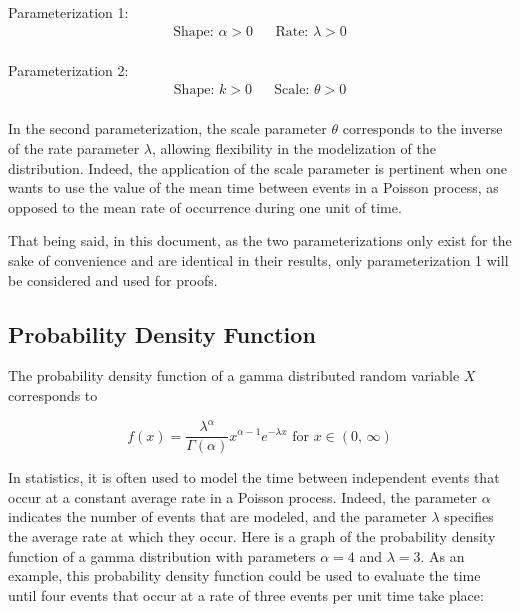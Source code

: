 \documentclass[12pt]{article}
\begin{document}
\noindent Parameterization 1:\vspace*{-24pt}
\begin{align*}
	\text{Shape: } \alpha>0		&&	\text{Rate: }\lambda>0
\end{align*}\\[-60pt]

\noindent Parameterization 2:\vspace*{-24pt}
\begin{align*}
	\text{Shape: } k>0			&&	\text{Scale: }\theta>0
\end{align*}\\[-60pt]

In the second parameterization, the scale parameter $\theta$ corresponds to the inverse of the rate parameter $\lambda$,
allowing flexibility in the modelization of the distribution. Indeed, the application of the scale parameter is
pertinent when one wants to use the value of the mean time between events in a Poisson process, as
opposed to the mean rate of occurrence during one unit of time.

That being said, in this document, as the two parameterizations only exist for the sake of convenience and are identical
in their results, only parameterization 1 will be considered and used for proofs.


\pagebreak
\subsection{Probability Density Function}\label{subsec:gamma:pdf}
The probability density function of a gamma distributed random variable $X$ corresponds to

\begin{equation}\label{eq:gamma:pdf}
	f(x) = \frac{\lambda^\alpha}{\Gamma(\alpha)}x^{\alpha-1}e^{-\lambda x}\text{ for }x\in (0,\,\infty)
\end{equation}

In statistics, it is often used to model the time between independent events that occur at a constant average rate in a
Poisson process. Indeed, the parameter $\alpha$ indicates the number of events that are modeled, and the parameter
$\lambda$ specifies the average rate at which they occur. Here is a graph of the probability density function of a gamma
distribution with parameters $\alpha=4$ and $\lambda=3$. As an example, this probability density function could be used
to evaluate the time until four events that occur at a rate of three events per unit time take place:
\end{document}
